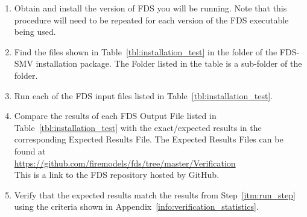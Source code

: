 \documentclass[11pt]{book}
\begin{document}
\begin{enumerate}
\item Obtain and install the version of FDS you will be running.  Note that this procedure will need to be repeated for each version of the FDS executable being used.
\item Find the files shown in Table~\ref{tbl:installation_test} in the  folder of the FDS-SMV installation package.  The Folder listed in the table is a sub-folder of the  folder.
\item Run each of the FDS input files listed in Table~\ref{tbl:installation_test}. \label{itm:run_step}
\item Compare the results of each FDS Output File listed in Table~\ref{tbl:installation_test} with the exact/expected results in the corresponding Expected Results File. The Expected Results Files can be found at \\ \href{https://github.com/firemodels/fds/tree/master/Verification}{https://github.com/firemodels/fds/tree/master/Verification} \\
    This is a link to the FDS repository hosted by GitHub.
\item Verify that the expected results match the results from Step~\ref{itm:run_step} using the criteria shown in Appendix~\ref{info:verification_statistics}.
\end{enumerate}
\end{document}
